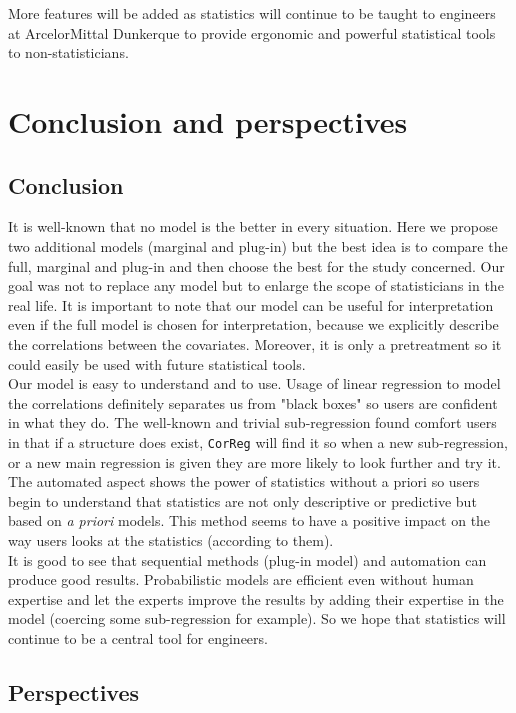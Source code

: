 \documentclass[12pt,a4paper]{report}
\begin{document}
	More features will be added as statistics will continue to be taught to engineers at ArcelorMittal Dunkerque to provide ergonomic and powerful statistical tools to non-statisticians. 
\chapter{Conclusion and perspectives}
	\section{Conclusion}
		It is well-known that no model is the better in every situation. Here we propose two additional models (marginal and plug-in) but the best idea is to compare the full, marginal and plug-in and then choose the best for the study concerned. Our goal was not to replace any model but to enlarge the scope of statisticians in the real life. It is important to note that our model can be useful for interpretation even if the full model is chosen for interpretation, because we explicitly describe the correlations between the covariates. Moreover, it is only a pretreatment so it could easily be used with future statistical tools. \\
		
		Our model is easy to understand and to use. Usage of linear regression to model the correlations definitely separates us from "black boxes" so users are confident in what they do. The well-known and trivial sub-regression found comfort users in that if a structure does exist, {\tt CorReg} will find it so when a new sub-regression, or a new main regression is given they are more likely to look further and try it. The automated aspect shows the power of statistics without a priori so users begin to understand that statistics are not only descriptive or predictive but based on {\it a priori} models. This method seems to have a positive impact on the way users looks at the statistics (according to them). \\
		
			It is good to see that sequential methods (plug-in model) and automation can produce good results. Probabilistic models are efficient even without human expertise and let the experts improve the results by adding their expertise in the model (coercing some sub-regression for example). So we hope that statistics will continue to be a central tool for engineers.
		
		
	\section{Perspectives}
\end{document}

